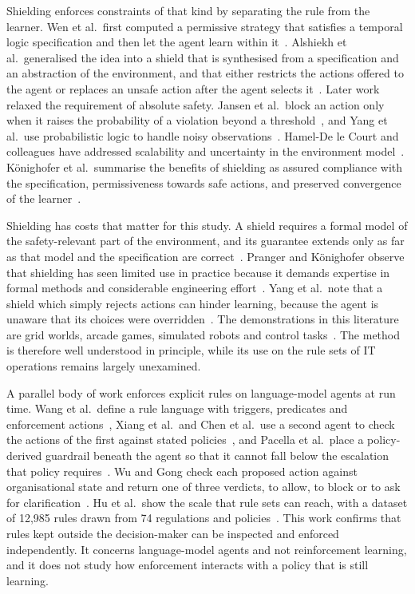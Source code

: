 Shielding enforces constraints of that kind by separating the rule from the learner. Wen et al.\ first computed a permissive strategy that satisfies a temporal logic specification and then let the agent learn within it~\cite{wen2015}. Alshiekh et al.\ generalised the idea into a shield that is synthesised from a specification and an abstraction of the environment, and that either restricts the actions offered to the agent or replaces an unsafe action after the agent selects it~\cite{alshiekh2018}. Later work relaxed the requirement of absolute safety. Jansen et al.\ block an action only when it raises the probability of a violation beyond a threshold~\cite{jansen2020}, and Yang et al.\ use probabilistic logic to handle noisy observations~\cite{yang2023}. Hamel-De le Court and colleagues have addressed scalability and uncertainty in the environment model~\cite{hamel2025,hamel2026}. K\"{o}nighofer et al.\ summarise the benefits of shielding as assured compliance with the specification, permissiveness towards safe actions, and preserved convergence of the learner~\cite{konighofer2025}.

Shielding has costs that matter for this study. A shield requires a formal model of the safety-relevant part of the environment, and its guarantee extends only as far as that model and the specification are correct~\cite{konighofer2025}. Pranger and K\"{o}nighofer observe that shielding has seen limited use in practice because it demands expertise in formal methods and considerable engineering effort~\cite{pranger2026}. Yang et al.\ note that a shield which simply rejects actions can hinder learning, because the agent is unaware that its choices were overridden~\cite{yang2023}. The demonstrations in this literature are grid worlds, arcade games, simulated robots and control tasks~\cite{alshiekh2018,jansen2020,achiam2017}. The method is therefore well understood in principle, while its use on the rule sets of IT operations remains largely unexamined.

A parallel body of work enforces explicit rules on language-model agents at run time. Wang et al.\ define a rule language with triggers, predicates and enforcement actions~\cite{wang2025agentspec}, Xiang et al.\ and Chen et al.\ use a second agent to check the actions of the first against stated policies~\cite{xiang2025,chen2025shieldagent}, and Pacella et al.\ place a policy-derived guardrail beneath the agent so that it cannot fall below the escalation that policy requires~\cite{pacella2026}. Wu and Gong check each proposed action against organisational state and return one of three verdicts, to allow, to block or to ask for clarification~\cite{wugong2026}. Hu et al.\ show the scale that rule sets can reach, with a dataset of 12,985 rules drawn from 74 regulations and policies~\cite{hu2026}. This work confirms that rules kept outside the decision-maker can be inspected and enforced independently. It concerns language-model agents and not reinforcement learning, and it does not study how enforcement interacts with a policy that is still learning.


